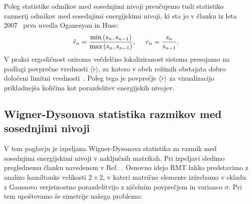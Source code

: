 { Poleg statistike odmikov med sosednjimi nivoji 
 preučujemo tudi statistiko razmerij odmikov med sosednjimi energijskimi nivoji, ki sta jo v članku iz leta 2007~\cite{PhysRevB.75.155111} prva uvedla Oganesyan in Huse:
 \begin{equation}\label{eq:oganesyan_huse}
 \tilde{r}_n=\frac{\min\left(s_n,s_{n-1}\right)}{\max\left(s_n,s_{n-1}\right)}, \hspace{5mm} r_n=\frac{s_n}{s_{n-1}}.
 \end{equation}
 V praksi ergodičnost oziroma večdelčno lokaliziranost sistema presojamo na podlagi povprečne vrednosti $\langle \tilde{r}\rangle$, za katero v obeh režimih obstajata dobro določeni limitni vrednosti~\cite{atas2013distribution}. Poleg tega je povprečje $\langle \tilde{r}\rangle$ za vizualizacijo prikladnejša količina kot porazdelitev energijskih nivojev. 
 \subsection{Wigner-Dysonova statistika razmikov med sosednjimi nivoji} 
 V tem poglavju je izpeljana Wigner-Dysonova statistika za razmik med sosednjimi energijskimi nivoji v naključnih matrikah. Pri izpeljavi sledimo preglednemu članku navedenem v Ref.~\cite{d2016quantum}.
 Osnovno idejo RMT lahko predstavimo z analizo hamiltonke velikosti $2\times2$, v kateri matrične elemente izžrebamo v skladu z Gaussovo verjetnostno porazdelitvijo z ničelnim povprečjem in varianco $\sigma$.  Pri tem upoštevamo še simetrije našega problema:

}
